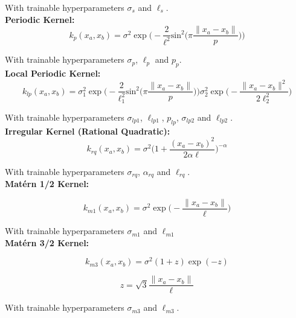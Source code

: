 \documentclass[11pt]{scrartcl}
\begin{document}
With trainable hyperparameters $\sigma_s$ and $\ell_s$. \\

\textbf{Periodic Kernel:}
\begin{equation}
    k_p(x_a, x_b) = \sigma^2 \exp \bigg( - \frac{2}{\ell^2} \text{sin}^2 \bigg( \pi \frac{\|x_a - x_b\|}{p} \bigg) \bigg)
\end{equation}

With trainable hyperparameters $\sigma_{p}$, $\ell_{p}$ and $p_{p}$. \\

\textbf{Local Periodic Kernel:}
\begin{equation}
    k_{lp}(x_a, x_b) = \sigma_1^2 \exp \bigg( - \frac{2}{\ell_1^2} \text{sin}^2 \bigg( \pi \frac{\|x_a - x_b\|}{p} \bigg) \bigg) \sigma_2^2 \exp \bigg( - \frac{\|{x_a - x_b}\| ^2}{2\ell_2^2} \bigg)
\end{equation}

With trainable hyperparameters $\sigma_{lp1}$, $\ell_{lp1}$, $p_{lp}$, $\sigma_{lp2}$ and $\ell_{lp2}$. \\

\textbf{Irregular Kernel (Rational Quadratic):}
\begin{equation}
    k_{rq}(x_a, x_b) = \sigma^2 \bigg(1 + \frac{(x_a - x_b)^2}{2\alpha\ell} \bigg)^{-\alpha}
\end{equation}

With trainable hyperparameters $\sigma_{rq}$, $\alpha_{rq}$ and $\ell_{rq}$. \\

\textbf{Matérn 1/2 Kernel:}

\begin{equation}
    k_{m1}(x_a, x_b) = \sigma^2 \exp \bigg(-\frac{\|x_a - x_b \|}{\ell} \bigg)
\end{equation}

With trainable hyperparameters $\sigma_{m1}$ and $\ell_{m1}$ \\

\textbf{Matérn 3/2 Kernel:}

\begin{equation}
    k_{m3}(x_a, x_b) = \sigma^2 (1 + z) \exp(-z)
\end{equation}

\begin{equation}
    z = \sqrt{3} \frac{\|x_a - x_b\|}{\ell}
\end{equation}

With trainable hyperparameters $\sigma_{m3}$ and $\ell_{m3}$. \\
\end{document}
